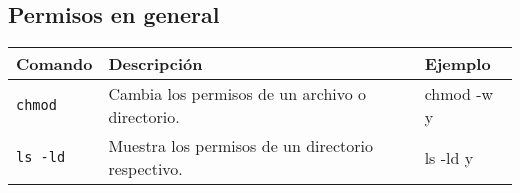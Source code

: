 \documentclass[12pt]{article}
\begin{document}
\subsection{Permisos en general}
\begin{tabular}{|p{3cm}|p{10cm}|p{2cm}|}
\hline
Comando & Descripción & Ejemplo \\
\hline
{\tt chmod} & Cambia los permisos de un archivo o directorio. & chmod -w y \\ \hline
{\tt ls -ld} & Muestra los permisos de un directorio respectivo. & ls -ld y \\ \hline
\end{tabular} 

\end{document}
